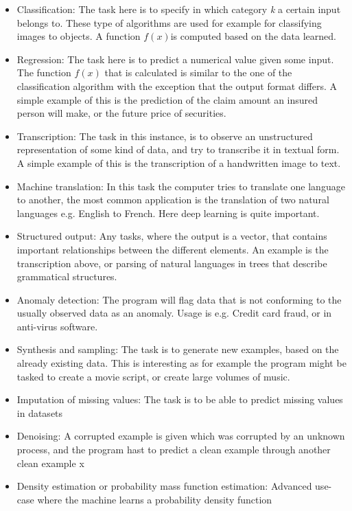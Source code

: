 \documentclass{article}
\begin{document}
\begin{itemize}
    \item Classification: The task here is to specify in which category \textit{k} a certain input belongs to. These type of algorithms are used for example for classifying images to objects. A function $f(x)$is computed based on the data learned.
    \item Regression: The task here is to predict a numerical value given some input. The function $f(x)$ that is calculated is similar to the one of the classification algorithm with the exception that the output format differs. A simple example of this is the prediction of the claim amount an insured person will make, or the future price of securities.
    \item Transcription: The task in this instance, is to observe an unstructured representation of some kind of data, and try to transcribe it in textual form. A simple example of this is the transcription of a handwritten image to text.
    \item Machine translation: In this task the computer tries to translate one language to another, the most common application is the translation of two natural languages e.g. English to French. Here deep learning is quite important.
    \item Structured output: Any tasks, where the output is a vector, that contains important relationships between the different elements. An example is the transcription above, or parsing of natural languages in trees that describe grammatical structures.
    \item Anomaly detection: The program will flag data that is not conforming to the usually observed data as an anomaly. Usage is e.g. Credit card fraud, or in anti-virus software.
    \item Synthesis and sampling: The task is to generate new examples, based on the already existing data. This is interesting as for example the program might be tasked to create a movie script, or create large volumes of music.
    \item Imputation of missing values: The task is to be able to predict missing values in datasets
    \item Denoising: A corrupted example is given which was corrupted by an unknown process, and the program hast to predict a clean example through another clean example x
    \item Density estimation or probability mass function estimation:  Advanced use-case where the machine learns a probability density function
\end{itemize}
\end{document}
